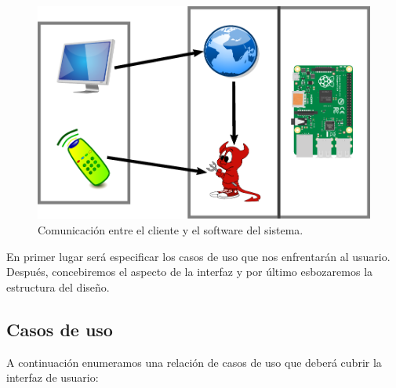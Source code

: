 \smallskip

\begin{figure}[H]
	\noindent \begin{centering}
		\includegraphics[width=\linewidth*2/3]{capitulo4/despliegue}
		\par\end{centering}
	\smallskip
	\caption{\label{fig:despliegue} Comunicación entre el cliente y el software del sistema.}
\end{figure} 

\smallskip

En primer lugar será especificar los casos de uso que nos enfrentarán al usuario. Después, concebiremos el aspecto de la interfaz y por último esbozaremos la estructura del diseño.

\subsection{Casos de uso}

A continuación enumeramos una relación de casos de uso que deberá cubrir la interfaz de usuario:

